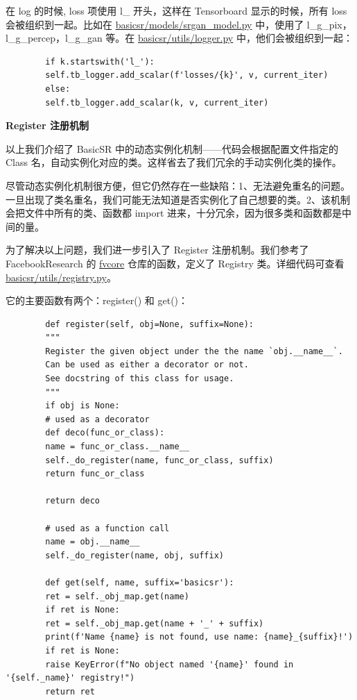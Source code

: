 \documentclass[../main.tex]{subfiles}
\begin{document}
	在 log 的时候, loss 项使用 l\_ 开头，这样在 Tensorboard 显示的时候，所有 loss 会被组织到一起。比如在 \href{https://github.com/XPixelGroup/BasicSR/blob/master/basicsr/models/srgan_model.py}{basicsr/models/srgan\_model.py} 中，使用了 l\_g\_pix，l\_g\_percep，l\_g\_gan 等。在 \href{https://github.com/XPixelGroup/BasicSR/blob/master/basicsr/utils/logger.py}{basicsr/utils/logger.py} 中，他们会被组织到一起：
	\begin{verbatim}
		if k.startswith('l_'):
		self.tb_logger.add_scalar(f'losses/{k}', v, current_iter)
		else:
		self.tb_logger.add_scalar(k, v, current_iter)
	\end{verbatim}
	
	\textbf{Register 注册机制}
	
	以上我们介绍了 BasicSR 中的动态实例化机制——代码会根据配置文件指定的Class 名，自动实例化对应的类。这样省去了我们冗余的手动实例化类的操作。
	
	尽管动态实例化机制很方便，但它仍然存在一些缺陷：1、无法避免重名的问题。一旦出现了类名重名，我们可能无法知道是否实例化了自己想要的类。2、该机制会把文件中所有的类、函数都 import 进来，十分冗余，因为很多类和函数都是中间的量。
	
	为了解决以上问题，我们进一步引入了 Register 注册机制。我们参考了 FacebookResearch 的 \href{https://github.com/facebookresearch/fvcore}{fvcore} 仓库的函数，定义了 Registry 类。详细代码可查看 \href{https://github.com/XPixelGroup/BasicSR/blob/master/basicsr/utils/registry.py}{basicsr/utils/registry.py}。
	
	它的主要函数有两个：register() 和 get()：
	\begin{verbatim}
		def register(self, obj=None, suffix=None):
		"""
		Register the given object under the the name `obj.__name__`.
		Can be used as either a decorator or not.
		See docstring of this class for usage.
		"""
		if obj is None:
		# used as a decorator
		def deco(func_or_class):
		name = func_or_class.__name__
		self._do_register(name, func_or_class, suffix)
		return func_or_class
		
		return deco
		
		# used as a function call
		name = obj.__name__
		self._do_register(name, obj, suffix)
		
		def get(self, name, suffix='basicsr'):
		ret = self._obj_map.get(name)
		if ret is None:
		ret = self._obj_map.get(name + '_' + suffix)
		print(f'Name {name} is not found, use name: {name}_{suffix}!')
		if ret is None:
		raise KeyError(f"No object named '{name}' found in '{self._name}' registry!")
		return ret
	\end{verbatim}
	
\end{document}

